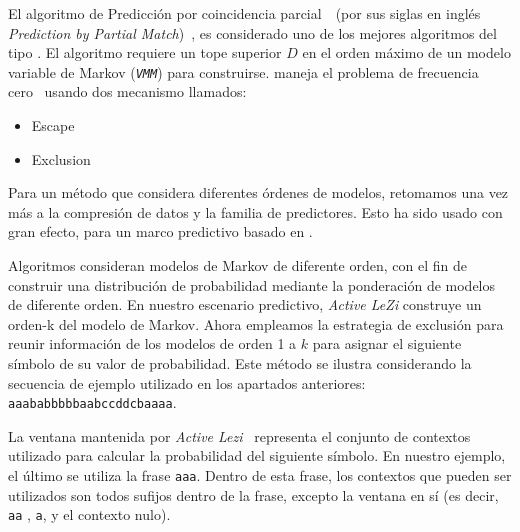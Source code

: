 


El algoritmo de Predicción por coincidencia parcial~\PPM~(por sus siglas en inglés \emph{Prediction by Partial Match})~\cite{Shkarin2002 }, es considerado uno de los mejores algoritmos del tipo \losslessdatacompression. El algoritmo requiere un tope superior $D$ en el orden máximo  de un modelo variable de Markov (\emph{\texttt{VMM}}) para construirse. \PPM maneja el problema de frecuencia cero~\cite{Begleiter2004} usando dos mecanismo llamados:
	\begin{itemize}
		\menorEspacioItemize
		\item Escape
		\item Exclusion
	\end{itemize}
	
Para un método que considera diferentes órdenes de modelos, retomamos una vez más a la compresión de datos y la familia de predictores.  Esto ha sido usado con gran efecto, para un marco predictivo basado en \lzSieteOcho. 

Algoritmos  \PPM consideran modelos de Markov de diferente orden,  con el fin de construir una distribución de probabilidad mediante la ponderación de modelos de diferente orden. En nuestro escenario predictivo, \emph{Active LeZi} construye un orden-k del modelo de Markov. Ahora empleamos la estrategia \PPM de exclusión para reunir información de los modelos de orden 1 a $k$ para asignar el siguiente símbolo de su valor de probabilidad. Este método se ilustra considerando la secuencia de ejemplo utilizado en los apartados anteriores: \texttt{aaababbbbbaabccddcbaaaa}.

La ventana mantenida por \emph{Active Lezi}~\cite{Gopalratnam2007} representa el conjunto de contextos utilizado para calcular la probabilidad  del siguiente símbolo. En nuestro ejemplo, el último se utiliza la frase \texttt{aaa}. Dentro de esta frase, los contextos que pueden ser utilizados son todos sufijos dentro de la frase, excepto la ventana en sí (es decir, \texttt{aa} , \texttt{a}, y el contexto nulo).

	
